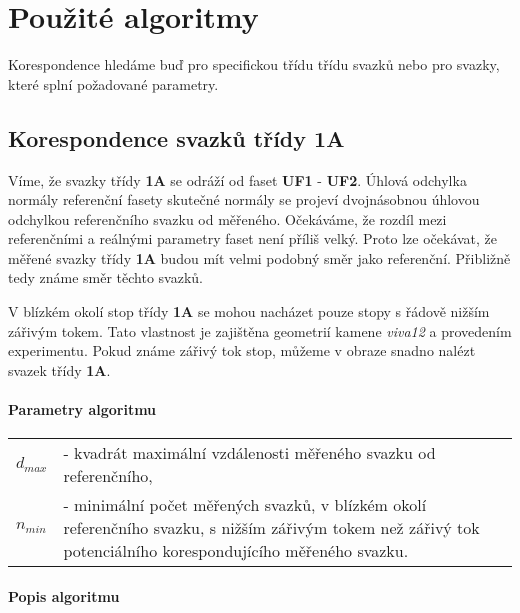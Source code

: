 	 

\section{Použité algoritmy}
	Korespondence hledáme buď pro specifickou třídu třídu svazků nebo pro svazky, které splní požadované parametry. 

\subsection{Korespondence svazků třídy \textbf{1A}}
\label{sec: 1A}

Víme, že svazky třídy \textbf{1A} se odráží od faset \textbf{UF1} - \textbf{UF2}. Úhlová odchylka normály referenční fasety skutečné normály se projeví dvojnásobnou úhlovou odchylkou referenčního svazku od měřeného. Očekáváme, že rozdíl mezi referenčními a reálnými parametry faset není příliš velký. Proto lze očekávat, že měřené svazky třídy \textbf{1A} budou mít velmi podobný směr jako referenční. Přibližně tedy známe směr těchto svazků.

V blízkém okolí stop třídy \textbf{1A} se mohou nacházet pouze stopy s řádově nižším zářivým tokem. Tato vlastnost je zajištěna geometrií kamene \textit{viva12} a provedením experimentu. Pokud známe zářivý tok stop, můžeme v obraze snadno nalézt svazek třídy \textbf{1A}. 

\paragraph{Parametry algoritmu}
\hspace{1mm}
	 
	 \begin{tabular}{l l}
	 $d_{max}$ & - kvadrát maximální vzdálenosti měřeného svazku od referenčního,\\
	 $n_{min}$ & - minimální počet měřených svazků, v blízkém okolí referenčního svazku, s nižším zářivým tokem než zářivý tok potenciálního korespondujícího měřeného svazku. \\
	 \end{tabular}
	
\paragraph{Popis algoritmu} 

